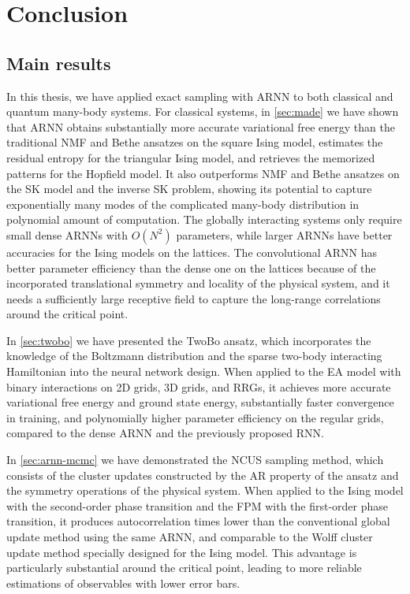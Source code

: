 \chapter{Conclusion}
\label{ch:conclusion}

\section{Main results}

In this thesis, we have applied exact sampling with ARNN to both classical and quantum many-body systems. For classical systems, in \cref{sec:made} we have shown that ARNN obtains substantially more accurate variational free energy than the traditional NMF and Bethe ansatzes on the square Ising model, estimates the residual entropy for the triangular Ising model, and retrieves the memorized patterns for the Hopfield model. It also outperforms NMF and Bethe ansatzes on the SK model and the inverse SK problem, showing its potential to capture exponentially many modes of the complicated many-body distribution in polynomial amount of computation. The globally interacting systems only require small dense ARNNs with $O(N^2)$ parameters, while larger ARNNs have better accuracies for the Ising models on the lattices. The convolutional ARNN has better parameter efficiency than the dense one on the lattices because of the incorporated translational symmetry and locality of the physical system, and it needs a sufficiently large receptive field to capture the long-range correlations around the critical point.

In \cref{sec:twobo} we have presented the TwoBo ansatz, which incorporates the knowledge of the Boltzmann distribution and the sparse two-body interacting Hamiltonian into the neural network design. When applied to the EA model with binary interactions on 2D grids, 3D grids, and RRGs, it achieves more accurate variational free energy and ground state energy, substantially faster convergence in training, and polynomially higher parameter efficiency on the regular grids, compared to the dense ARNN and the previously proposed RNN.

In \cref{sec:arnn-mcmc} we have demonstrated the NCUS sampling method, which consists of the cluster updates constructed by the AR property of the ansatz and the symmetry operations of the physical system. When applied to the Ising model with the second-order phase transition and the FPM with the first-order phase transition, it produces autocorrelation times lower than the conventional global update method using the same ARNN, and comparable to the Wolff cluster update method specially designed for the Ising model. This advantage is particularly substantial around the critical point, leading to more reliable estimations of observables with lower error bars.

